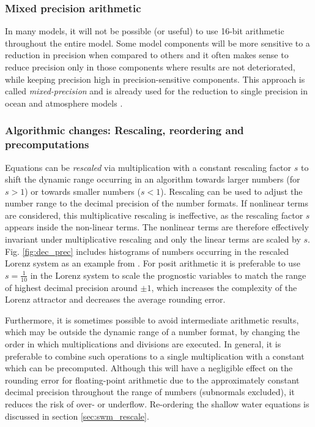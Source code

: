 \documentclass[draft]{agujournal2019}
\begin{document}
\subsubsection{Mixed precision arithmetic}

In many models, it will not be possible (or useful) to use 16-bit arithmetic
throughout the entire model. Some model components will be more sensitive to a
reduction in precision when compared to others and it often makes sense to reduce
precision only in those components where results are not deteriorated, while
keeping precision high in precision-sensitive components. This approach is
called \emph{mixed-precision} and is already used for the reduction to single
precision in ocean and atmosphere models \cite{Vana2017,TintoPrims2019}.

\subsubsection{Algorithmic changes: Rescaling, reordering and precomputations}

Equations can be \emph{rescaled} via multiplication with a constant rescaling
factor $s$ to shift the dynamic range occurring in an algorithm towards larger
numbers (for $s > 1$) or towards smaller numbers ($s < 1$).
Rescaling can be used to adjust the number range to the decimal precision of the
number formats. If nonlinear terms are considered, this multiplicative rescaling
is ineffective, as the rescaling factor $s$ appears inside the non-linear terms.
The nonlinear terms are therefore effectively invariant under multiplicative
rescaling and only the linear terms are scaled by $s$.
Fig. \ref{fig:dec_prec} includes histograms of numbers occurring in the rescaled
Lorenz system \cite{Lorenz1963,Kwasniok2014,Jeffress2017,Tantet2018} as an example
from . For posit arithmetic it is preferable to use
$s=\tfrac{1}{10}$ in the Lorenz system to scale the prognostic variables
to match the range of highest decimal precision around $\pm1$, which increases the
complexity of the Lorenz attractor and decreases the average rounding error.

Furthermore, it is sometimes possible to avoid intermediate arithmetic results,
which may be outside the dynamic range of a number format, by changing the order
in which multiplications and divisions are executed. In general, it is preferable
to combine such operations to a single multiplication with a constant which can
be precomputed. Although this will have a negligible effect on the rounding error
for floating-point arithmetic due to the approximately constant decimal precision
throughout the range of numbers (subnormals excluded), it reduces the risk of
over- or underflow. Re-ordering the shallow water equations is discussed in
section \ref{sec:swm_rescale}.
\end{document}
